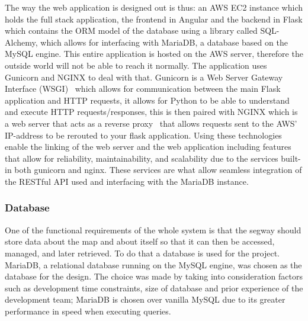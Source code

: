 The way the web application is designed out is thus: an AWS EC2 instance which holds the full stack application, the frontend in Angular and the backend in Flask which contains the ORM model of the database using a library called SQL-Alchemy, which allows for interfacing with MariaDB, a database based on the MySQL engine. This entire application is hosted on the AWS server, therefore the outside world will not be able to reach it normally. The application uses Gunicorn and NGINX to deal with that. Gunicorn is a Web Server Gateway Interface (WSGI)~\cite{ref:gunicorn} which allows for communication between the main Flask application and HTTP requests, it allows for Python to be able to understand and execute HTTP requests/responses, this is then paired with NGINX which is a web server that acts as a reverse proxy~\cite{ref:nginx} that allows requests sent to the AWS’ IP-address to be rerouted to your flask application. Using these technologies enable the linking of the web server and the web application including features that allow for reliability, maintainability, and scalability due to the services built-in both gunicorn and nginx. These services are what allow seamless integration of the RESTful API used and interfacing with the MariaDB instance.

\subsubsection{Database}
One of the functional requirements of the whole system is that the segway should store data about the map and about itself so that it can then be accessed, managed, and later retrieved. To do that a database is used for the project. MariaDB, a relational database running on the MySQL engine, was chosen as the database for the design. The choice was made by taking into consideration factors such as development time constraints, size of database and prior experience of the development team; MariaDB is chosen over vanilla MySQL due to its greater performance in speed when executing queries. 

